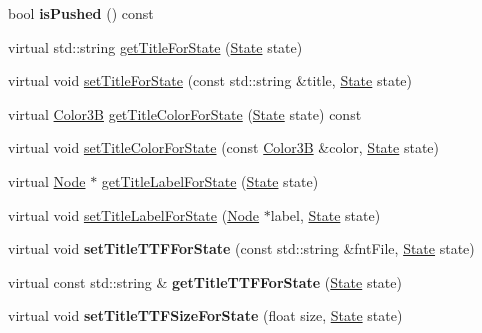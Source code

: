 \begin{DoxyCompactItemize}
bool {\bfseries is\+Pushed} () const
\item 
virtual std\+::string \hyperlink{classControlButton_afd7b890cb4494d7545bc8990ba43dbc2}{get\+Title\+For\+State} (\hyperlink{classControl_a89e9598cd785841ac91cff3c4798c469}{State} state)
\item 
virtual void \hyperlink{classControlButton_a911d31d0c0e4d137947184bc5043ac5d}{set\+Title\+For\+State} (const std\+::string \&title, \hyperlink{classControl_a89e9598cd785841ac91cff3c4798c469}{State} state)
\item 
virtual \hyperlink{structColor3B}{Color3B} \hyperlink{classControlButton_a8600aaa72e3bbddd9d02d4b0c500ad2c}{get\+Title\+Color\+For\+State} (\hyperlink{classControl_a89e9598cd785841ac91cff3c4798c469}{State} state) const
\item 
virtual void \hyperlink{classControlButton_af38b84f1d4d45058df227ce7a6eccde9}{set\+Title\+Color\+For\+State} (const \hyperlink{structColor3B}{Color3B} \&color, \hyperlink{classControl_a89e9598cd785841ac91cff3c4798c469}{State} state)
\item 
virtual \hyperlink{classNode}{Node} $\ast$ \hyperlink{classControlButton_a821e4dabfed66cb39ed8ba1fe67d8a7b}{get\+Title\+Label\+For\+State} (\hyperlink{classControl_a89e9598cd785841ac91cff3c4798c469}{State} state)
\item 
virtual void \hyperlink{classControlButton_a51963a12c2ace5ffc3a61587a20f406d}{set\+Title\+Label\+For\+State} (\hyperlink{classNode}{Node} $\ast$label, \hyperlink{classControl_a89e9598cd785841ac91cff3c4798c469}{State} state)
\item 
\mbox{\label{classControlButton_a8f6732bc9758bc8c312dd6c4b1441e4d}} 
virtual void {\bfseries set\+Title\+T\+T\+F\+For\+State} (const std\+::string \&fnt\+File, \hyperlink{classControl_a89e9598cd785841ac91cff3c4798c469}{State} state)
\item 
\mbox{\label{classControlButton_ad39660fcb417a940eb8b5d6ff4006f0e}} 
virtual const std\+::string \& {\bfseries get\+Title\+T\+T\+F\+For\+State} (\hyperlink{classControl_a89e9598cd785841ac91cff3c4798c469}{State} state)
\item 
\mbox{\label{classControlButton_ab9173a4b678a226010a33c7636c8ba2a}} 
virtual void {\bfseries set\+Title\+T\+T\+F\+Size\+For\+State} (float size, \hyperlink{classControl_a89e9598cd785841ac91cff3c4798c469}{State} state)

\end{DoxyCompactItemize}
